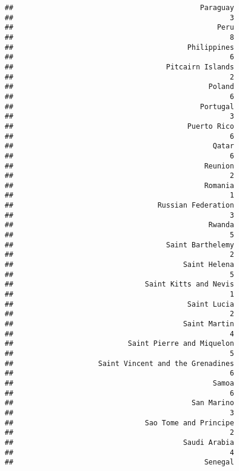 \documentclass[
]{article}
\begin{document}
\begin{verbatim}
##                                            Paraguay 
##                                                   3 
##                                                Peru 
##                                                   8 
##                                         Philippines 
##                                                   6 
##                                    Pitcairn Islands 
##                                                   2 
##                                              Poland 
##                                                   6 
##                                            Portugal 
##                                                   3 
##                                         Puerto Rico 
##                                                   6 
##                                               Qatar 
##                                                   6 
##                                             Reunion 
##                                                   2 
##                                             Romania 
##                                                   1 
##                                  Russian Federation 
##                                                   3 
##                                              Rwanda 
##                                                   5 
##                                    Saint Barthelemy 
##                                                   2 
##                                        Saint Helena 
##                                                   5 
##                               Saint Kitts and Nevis 
##                                                   1 
##                                         Saint Lucia 
##                                                   2 
##                                        Saint Martin 
##                                                   4 
##                           Saint Pierre and Miquelon 
##                                                   5 
##                    Saint Vincent and the Grenadines 
##                                                   6 
##                                               Samoa 
##                                                   6 
##                                          San Marino 
##                                                   3 
##                               Sao Tome and Principe 
##                                                   2 
##                                        Saudi Arabia 
##                                                   4 
##                                             Senegal 

\end{verbatim}
\end{document}
